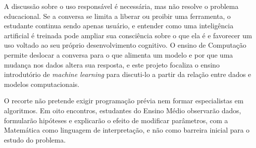 A discussão sobre o uso responsável é necessária, mas não resolve o problema educacional. Se a conversa se limita a liberar ou proibir uma ferramenta, o estudante continua sendo apenas usuário, e entender como uma inteligência artificial é treinada pode ampliar sua consciência sobre o que ela é e favorecer um uso voltado ao seu próprio desenvolvimento cognitivo. O ensino de Computação permite deslocar a conversa para o que alimenta um modelo e por que uma mudança nos dados altera sua resposta, e este projeto focaliza o ensino introdutório de \textit{machine learning} para discuti-lo a partir da relação entre dados e modelos computacionais.

O recorte não pretende exigir programação prévia nem formar especialistas em algoritmos. Em oito encontros, estudantes do Ensino Médio observarão dados, formularão hipóteses e explicarão o efeito de modificar parâmetros, com a Matemática como linguagem de interpretação, e não como barreira inicial para o estudo do problema.


